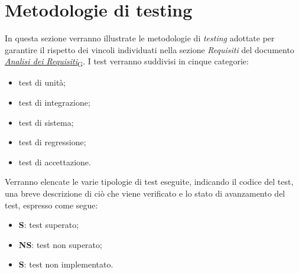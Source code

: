 \section{Metodologie di testing}
In questa sezione verranno illustrate le metodologie di \textit{testing} adottate per garantire il rispetto dei vincoli individuati
nella sezione \textit{Requisiti} del documento \href{https://7last.github.io/docs/rtb/documentazione-esterna/analisi-dei-requisiti}{\href{https://7last.github.io/docs/pb/documentazione-interna/glossario\#analisi-dei-requisiti}{\textit{Analisi dei Requisiti}\textsubscript{G}}}.
I test verranno suddivisi in cinque categorie:
\begin{itemize}
	\item test di unità;
	\item test di integrazione;
	\item test di sistema;
	\item test di regressione;
	\item test di accettazione.
\end{itemize}

Verranno elencate le varie tipologie di test eseguite, indicando il codice del test, una breve descrizione di ciò che viene verificato e lo stato di avanzamento del test, espresso come segue:
\begin{itemize}
	\item \textbf{S}: test superato;
	\item \textbf{NS}: test non superato;
	\item \textbf{S}: test non implementato.
\end{itemize}

